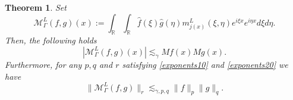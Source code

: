 \documentclass{amsart}
\newcommand{\R}{\mathbb{R}}
\newcommand{\M}{\mathcal{M}}
\newtheorem{theorem}{Theorem}[section]
\theoremstyle{definition}
\theoremstyle{remark}
\numberwithin{equation}{section}
\begin{document}
\begin{theorem}\label{low_frequency_theorem}
Set
\begin{equation}\label{operator_low_freq}
 \M^L_\Gamma(f,g)(x):=\int_\R \int_\R \hat{f}(\xi)\hat{g}(\eta)m_{j(x)}^L(\xi,\eta)e^{i\xi x}e^{i\eta x}d\xi d\eta.
\end{equation}
Then, the following holds
\begin{equation}\label{pointwise_maximal}
 |\M_\Gamma^L(f,g)(x)|\lesssim_\gamma Mf(x)Mg(x).
\end{equation}
Furthermore, for any $p, q$ and $r$ satisfying \eqref{exponents10} and \eqref{exponents20} we have
\begin{equation}\label{pointwise_maximal_bound}
 \|\M_\Gamma^L(f,g)\|_r\lesssim_{\gamma,p,q}\|f\|_p\|g\|_{q}.
\end{equation}
\end{theorem}
\end{document}

